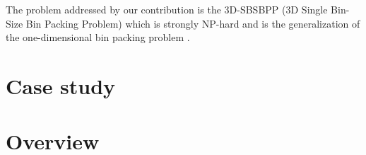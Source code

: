 The problem addressed by our contribution is the 3D-SBSBPP (3D Single Bin-Size Bin Packing Problem) which is strongly NP-hard and is the generalization of the one-dimensional bin packing problem \citep{martello2000three}.

\section*{Case study}
\label{sec:intro:case_study}%

\section*{Overview}
\label{sec:intro:overview}%
